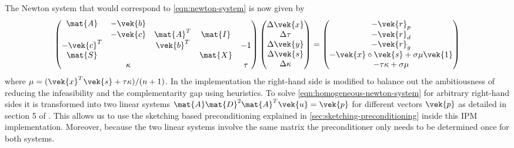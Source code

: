 The Newton system that would correspond to \cref{eqn:newton-system} is now given by
\begin{equation}\label{eqn:homogeneous-newton-system}
  \begin{pmatrix}
    \mat{A}    & -\vek{b} &           &         &         \\
               & -\vek{c} & \mat{A}^T & \mat{I} &         \\
    -\vek{c}^T &          & \vek{b}^T &         & -1 \\
    \mat{S}    &          &           & \mat{X} &         \\
               & \kappa   &           &         & \tau
  \end{pmatrix}
  \begin{pmatrix}
    \Delta\vek{x} \\
    \Delta\tau \\
    \Delta\vek{y} \\
    \Delta\vek{s} \\
    \Delta\kappa
  \end{pmatrix}
  =
  \begin{pmatrix}
    -\vek{r}_p \\
    -\vek{r}_d \\
    -\vek{r}_g \\
    -\vek{x} \circ \vek{s} + \sigma \mu \vek{1} \\
    -\tau \kappa + \sigma \mu
  \end{pmatrix}
\end{equation}
where \(\mu = (\vek{x}^T \vek{s} + \tau \kappa)/(n+1)\).
In the implementation the right-hand side is modified to balance out the ambitiousness of reducing the infeasibility and the complementarity gap using heuristics.
To solve \cref{eqn:homogeneous-newton-system} for arbitrary right-hand sides it is transformed into two linear systems \(\mat{A}\mat{D}^2\mat{A}^T\vek{u} = \vek{p}\) for different vectors \(\vek{p}\) as detailed in section 5 of \cite{AndersenAndersen-MosekInteriorPointMethod}.
This allows us to use the sketching based preconditioning explained in \cref{sec:sketching-preconditioning} inside this IPM implementation.
Moreover, because the two linear systems involve the same matrix the preconditioner only needs to be determined once for both systems.

